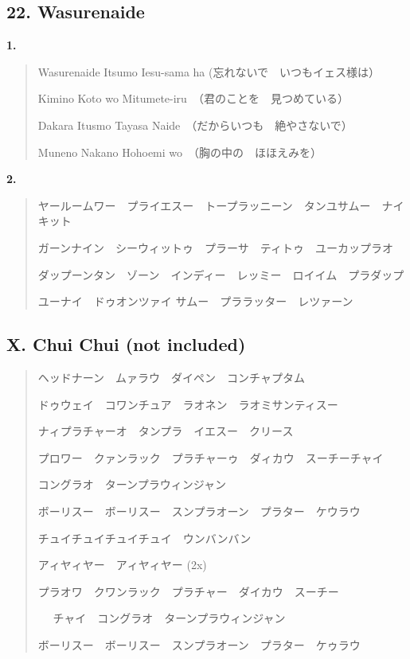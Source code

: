 \documentclass[a4paper, twocolumn]{article}
\begin{document}



\subsection*{22. Wasurenaide}

{\bf 1. } \vspace*{-5mm}
\begin{quote}
Wasurenaide Itsumo Iesu-sama ha (忘れないで　いつもイェス様は）\par
Kimino Koto wo Mitumete-iru　（君のことを　見つめている）\par
Dakara Itusmo Tayasa Naide　（だからいつも　絶やさないで）\par
Muneno Nakano Hohoemi wo　（胸の中の　ほほえみを）
\end{quote}

\noindent
{\bf 2. } \vspace*{-5mm}
\begin{quote}
ヤールームワー　プライエスー　トープラッニーン　タンユサムー　ナイキット\par
ガーンナイン　シーウィットゥ　プラーサ　ティトゥ　ユーカップラオ\par
ダップーンタン　ゾーン　インディー　レッミー　ロイイム　プラダップ\par
ユーナイ　ドゥオンツァイ サムー　プララッター　レツァーン
\end{quote}

\subsection*{X. Chui Chui (not included)}

\begin{quote}
ヘッドナーン　ムァラウ　ダイペン　コンチャプタム\par
ドゥウェイ　コワンチュア　ラオネン　ラオミサンティスー\par
ナィプラチャーオ　タンプラ　イエスー　クリース\par
プロワー　クァンラック　プラチャーゥ　ダィカウ　スーチーチャイ\par
コングラオ　ターンプラウィンジャン

\medskip
ボーリスー　ボーリスー　スンプラオーン　プラター　ケウラウ\par
チュイチュイチュイチュイ　ウンバンバン\par
アィヤィヤー　アィヤィヤー (2x)

\medskip
プラオワ　クワンラック　プラチャー　ダイカウ　スーチー\par　
チャイ　コングラオ　ターンプラウィンジャン

\medskip
ボーリスー　ボーリスー　スンプラオーン　プラター　ケゥラウ
\end{quote}
\end{document}
